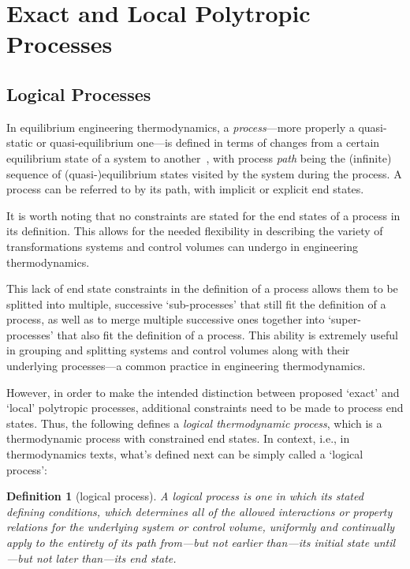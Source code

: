 \documentclass[fleqn,11pt]{SelfArx}
\newtheorem{definition}{Definition}
\begin{document}
\section{Exact and Local Polytropic Processes}\label{sec:exact.poly}

    \subsection{Logical Processes}\label{sec:logical}

    In equilibrium engineering thermodynamics, a \emph{process}---more properly  a  quasi-static
    or quasi-equilibrium one---is defined in terms of changes from a certain  equilibrium  state
    of a system to another~\cite{2013-CengelYA+BolesMA-AMGH}, with process \emph{path} being the
    (infinite) sequence of (quasi-)equilibrium states visited by the system during the  process.
    A process can be referred to by its path, with implicit or explicit end states.

    It is worth noting that no constraints are stated for the end states of  a  process  in  its
    definition.  This  allows  for  the  needed  flexibility  in  describing  the   variety   of
    transformations systems and control volumes can undergo in engineering thermodynamics.

    This lack of end state constraints in the definition of a process allows them to be splitted
    into multiple, successive `sub-processes' that still fit the definition  of  a  process,  as
    well as to merge multiple successive ones together into `super-processes' that also fit  the
    definition of a process. This ability is extremely useful in grouping and splitting  systems
    and control volumes along with their underlying processes---a common practice in engineering
    thermodynamics.

    However, in order to make the intended distinction  between  proposed  `exact'  and  `local'
    polytropic processes, additional constraints need to be made to process  end  states.  Thus,
    the following defines a \emph{logical  thermodynamic  process},  which  is  a  thermodynamic
    process with constrained end states. In  context,  i.e.,  in  thermodynamics  texts,  what's
    defined next can be simply called a `logical process':

    \begin{definition}[logical process]\label{def:logical.proc}
        A logical process is one in which its stated defining conditions, which  determines  all
        of the allowed interactions or property relations for the underlying system  or  control
        volume, uniformly and continually apply to the  entirety  of  its  path  from---but  not
        earlier than---its initial state until---but not later than---its end state.
    \end{definition}
\end{document}
